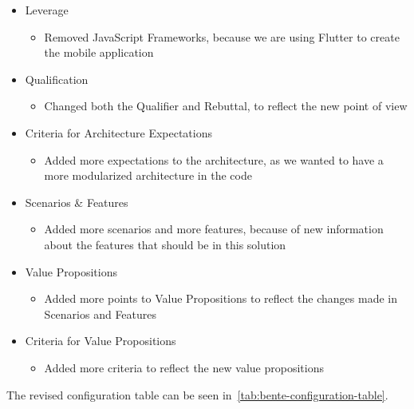 \begin{itemize}
    \item Leverage
    \begin{itemize}
        \item Removed JavaScript Frameworks, because we are using Flutter to create the mobile application
    \end{itemize}
    \item Qualification
    \begin{itemize}
        \item Changed both the Qualifier and Rebuttal, to reflect the new point of view
    \end{itemize}
    \item Criteria for Architecture Expectations
    \begin{itemize}
        \item Added more expectations to the architecture, as we wanted to have a more modularized architecture in the code
    \end{itemize}
    \item Scenarios \& Features
    \begin{itemize}
        \item Added more scenarios and more features, because of new information about the features that should be in this solution
    \end{itemize}
    \item Value Propositions
    \begin{itemize}
        \item Added more points to Value Propositions to reflect the changes made in Scenarios and Features
    \end{itemize}
    \item Criteria for Value Propositions
    \begin{itemize}
        \item Added more criteria to reflect the new value propositions 
    \end{itemize}
\end{itemize}

The revised configuration table can be seen in~\autoref{tab:bente-configuration-table}.

